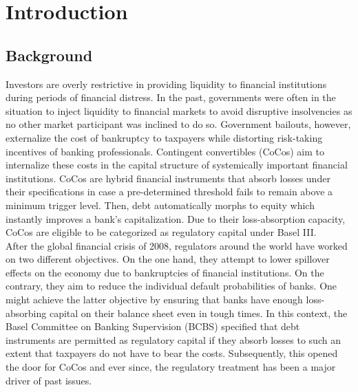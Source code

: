 \chapter{Introduction}

\section{Background}
Investors are overly restrictive in providing liquidity to financial institutions during periods of financial distress. In the past, governments were often in the situation to inject liquidity to financial markets to avoid disruptive insolvencies as no other market participant was inclined to do so. Government bailouts, however, externalize the cost of bankruptcy to taxpayers while distorting risk-taking incentives of banking professionals. Contingent convertibles (CoCos) aim to internalize these costs in the capital structure of systemically important financial institutions. CoCos are hybrid financial instruments that absorb losses under their specifications in case a pre-determined threshold fails to remain above a minimum trigger level. Then, debt automatically morphs to equity which instantly improves a bank's capitalization. Due to their loss-absorption capacity, CoCos are eligible to be categorized as regulatory capital under Basel III. \citep{avdjiev2013cocos} \\

After the global financial crisis of 2008, regulators around the world have worked on two different objectives. On the one hand, they attempt to lower spillover effects on the economy due to bankruptcies of financial institutions. On the contrary, they aim to reduce the individual default probabilities of banks. One might achieve the latter objective by ensuring that banks have enough loss-absorbing capital on their balance sheet even in tough times. \citep{de2011handbook} In this context, the Basel Committee on Banking Supervision (BCBS) specified that debt instruments are permitted as regulatory capital if they absorb losses to such an extent that taxpayers do not have to bear the costs. \citep{basel2011press} Subsequently, this opened the door for CoCos and ever since, the regulatory treatment has been a major driver of past issues.


